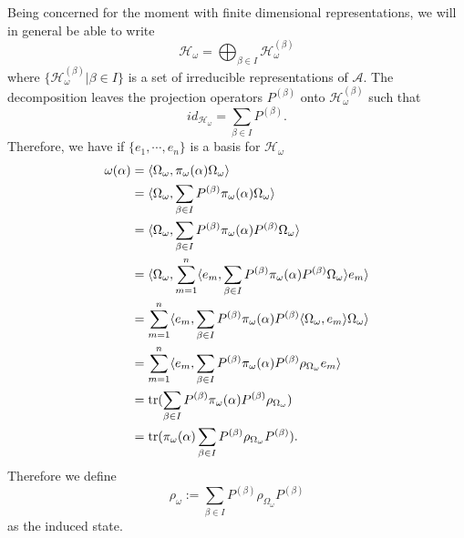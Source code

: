 Being concerned for the moment with finite dimensional representations, we will in general be able to write
\begin{equation}
\mathcal{H}_\omega = \bigoplus_{\beta\in I}\mathcal{H}_\omega^{(\beta)}
\end{equation}
where $\{\mathcal{H}_\omega^{(\beta)}|\beta\in I\}$ is a set of irreducible representations of $\mathcal{A}$. The decomposition leaves the projection operators $P^{(\beta)}$ onto $\mathcal{H}_\omega^{(\beta)}$ such that
\begin{equation}
id_{\mathcal{H}_\omega}=\sum_{\beta\in I}P^{(\beta)}.
\end{equation}
Therefore, we have if $\{e_1,\cdots,e_n\}$ is a basis for $\mathcal{H}_\omega$
\begin{align}
\begin{split}
\omega(\alpha)&=\langle \Omega_\omega, \pi_\omega(\alpha)\Omega_\omega\rangle \\
&=\langle\Omega_\omega,\sum_{\beta\in I}P^{(\beta)}\pi_\omega(\alpha)\Omega_\omega\rangle \\
&=\langle\Omega_\omega,\sum_{\beta\in I}P^{(\beta)}\pi_\omega(\alpha)P^{(\beta)}\Omega_\omega\rangle \\
&=\langle\Omega_\omega,\sum_{m=1}^n\langle e_m,\sum_{\beta\in I}P^{(\beta)}\pi_\omega(\alpha) P^{(\beta)}\Omega_\omega\rangle e_m\rangle \\
&=\sum_{m=1}^n\langle e_m,\sum_{\beta\in I}P^{(\beta)}\pi_\omega(\alpha) P^{(\beta)}\langle\Omega_\omega, e_m\rangle\Omega_\omega\rangle \\
&=\sum_{m=1}^n\langle e_m,\sum_{\beta\in I}P^{(\beta)}\pi_\omega(\alpha) P^{(\beta)}\rho_{\Omega_\omega} e_m\rangle \\
&=\operatorname{tr}(\sum_{\beta\in I}P^{(\beta)}\pi_\omega(\alpha) P^{(\beta)}\rho_{\Omega_\omega})\\
&=\operatorname{tr}(\pi_\omega(\alpha)\sum_{\beta\in I}P^{(\beta)}\rho_{\Omega_\omega} P^{(\beta)}).
\end{split}
\end{align}
Therefore we define
\begin{equation}\label{eq:entropy}
\rho_\omega := \sum_{\beta\in I}P^{(\beta)}\rho_{\Omega_\omega} P^{(\beta)}
\end{equation}
as the induced state.

